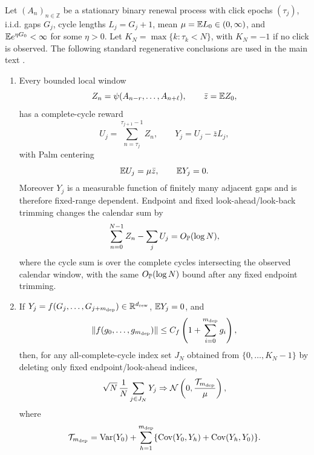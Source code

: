 \begin{proposition}\label{prop:standard-complete-cycle-separated-batch-facts-main}
Let \((A_n)_{n\in\mathbb Z}\) be a stationary binary renewal process with
click epochs \((\tau_j)\), i.i.d. gaps \(G_j\), cycle lengths
\(L_j=G_j+1\), mean \(\mu=\mathbb E L_0\in(0,\infty)\), and
\(\mathbb E e^{\eta G_0}<\infty\) for some \(\eta>0\).  Let
\(K_N=\max\{k:\tau_k<N\}\), with \(K_N=-1\) if no click is observed.  The
following standard regenerative conclusions are used in the main text
\cite{GlynnIglehart1990STS,AsmussenGlynn2007,GlynnWhitt1991BatchMeans,
VatsFlegalJones2019Multivariate}.
\begin{enumerate}[label=\textup{(\alph*)},leftmargin=2.4em,itemsep=0.25em]
\item Every bounded local window
\[
Z_n=\psi(A_{n-r},\ldots,A_{n+\ell}),\qquad \bar z=\mathbb E Z_0,
\]
has a complete-cycle reward
\[
U_j=\sum_{n=\tau_j}^{\tau_{j+1}-1}Z_n,\qquad
Y_j=U_j-\bar zL_j,
\]
with Palm centering
\begin{equation}\label{eq:local-window-palm-inversion-main}
\mathbb E U_j=\mu\bar z,\qquad \mathbb E Y_j=0 .
\end{equation}
Moreover \(Y_j\) is a measurable function of finitely many adjacent gaps and
is therefore fixed-range dependent.  Endpoint and fixed look-ahead/look-back
trimming changes the calendar sum by
\begin{equation}\label{eq:local-window-endpoint-main}
\sum_{n=0}^{N-1}Z_n-\sum_j U_j=O_{\mathbb P}(\log N),
\end{equation}
where the cycle sum is over the complete cycles intersecting the observed
calendar window, with the same \(O_{\mathbb P}(\log N)\) bound after any fixed
endpoint trimming.

\item If \(Y_j=f(G_j,\ldots,G_{j+m_{\rm dep}})\in\mathbb R^{d_{\rm rew}}\),
\(\mathbb E Y_j=0\), and
\[
\|f(g_0,\ldots,g_{m_{\rm dep}})\|
\le C_f\left(1+\sum_{i=0}^{m_{\rm dep}}g_i\right),
\]
then, for any all-complete-cycle index set \(J_N\) obtained from
\(\{0,\ldots,K_N-1\}\) by deleting only fixed endpoint/look-ahead indices,
\[
\sqrt N\,\frac1N\sum_{j\in J_N}Y_j
\Rightarrow
\mathcal N\left(0,\frac{\mathcal T_{m_{\rm dep}}}{\mu}\right),
\]
where
\[
\mathcal T_{m_{\rm dep}}
=\mathrm{Var}(Y_0)+
\sum_{h=1}^{m_{\rm dep}}
\{\operatorname{Cov}(Y_0,Y_h)+\operatorname{Cov}(Y_h,Y_0)\}.
\]


\end{enumerate}
\end{proposition}
